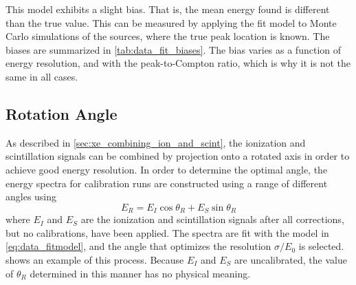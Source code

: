 \documentclass[herrin-thesis.tex]{subfiles}
\begin{document}
This model exhibits a slight bias. That is, the mean energy found is different than the true value. This can be measured by applying the fit model to Monte Carlo simulations of the sources, where the true peak location is known. The biases are summarized in \cref{tab:data_fit_biases}. The bias varies as a function of energy resolution, and with the peak-to-Compton ratio, which is why it is not the same in all cases.

\subsection{Rotation Angle}
\label{sec:data_rotation_angle}
As described in \cref{sec:xe_combining_ion_and_scint}, the ionization and scintillation signals can be combined by projection onto a rotated axis in order to achieve good energy resolution. In order to determine the optimal angle, the energy spectra for calibration runs are constructed using a range of different angles using
\begin{equation}
E_R = E_{I}\cos\theta_R + E_{S}\sin\theta_R
\label{eq:data_E_rotated}
\end{equation}
where \(E_I\) and \(E_S\) are the ionization and scintillation signals after all corrections, but no calibrations, have been applied. The spectra are fit with the model in \cref{eq:data_fitmodel}, and the angle that optimizes the resolution \(\sigma/E_0\) is selected.  shows an example of this process. Because \(E_I\) and \(E_S\) are uncalibrated, the value of \(\theta_R\) determined in this manner has no physical meaning.
\end{document}
